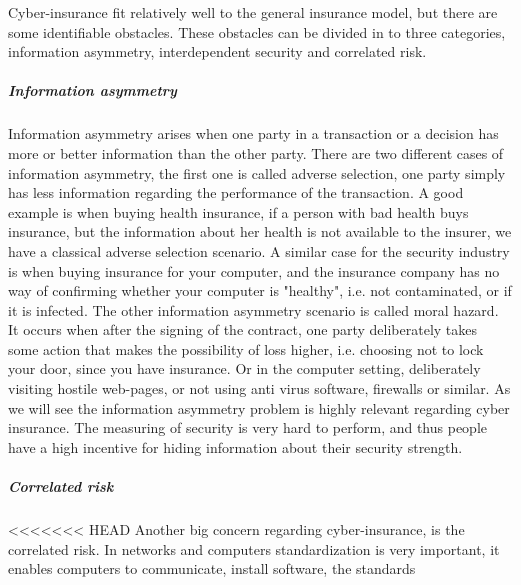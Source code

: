 Cyber-insurance fit relatively well to the general insurance model, but there are some identifiable obstacles. These obstacles can be divided in to three categories, information asymmetry, interdependent security and  correlated risk. 
\subparagraph{Information asymmetry}
Information asymmetry arises when one party in a transaction or a decision has more or better
 information than the other party. There are two different cases of information asymmetry, the first
  one is called adverse selection, one party simply has less information regarding the performance of
   the transaction. A good example is when buying health insurance, if a person with bad health buys
    insurance, but the information about her health is not available to the insurer, we have a
     classical adverse selection scenario. A similar case for the security industry is when buying
      insurance for your computer, and the insurance company has no way of confirming whether your
       computer is "healthy", i.e. not contaminated, or if it is infected. 
The other information asymmetry scenario is called moral hazard. It occurs when after the signing of
 the contract, one party deliberately takes some action that makes the possibility of loss higher,
  i.e. choosing not to lock your door, since you have insurance. Or in the computer setting,
   deliberately visiting hostile web-pages, or not using anti virus software, firewalls or similar.
    \cite{bohme2010modeling}
As we will see the information asymmetry problem is highly relevant regarding cyber insurance.
 The measuring of security is very hard to perform, and thus people have a 
 high incentive for hiding information about their security strength. 
\subparagraph{Correlated risk}
<<<<<<< HEAD
Another big concern regarding cyber-insurance, is the correlated risk. In networks and computers standardization is very important, it enables computers to communicate, install software, the standards

